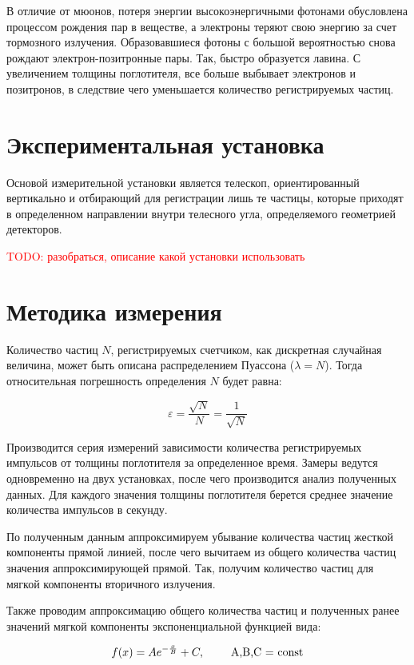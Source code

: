 \documentclass[reprint, nofootinbib, nobalancelastpage, 10pt]{revtex4-2}
\begin{document}
В отличие от мюонов, потеря энергии высокоэнергичными фотонами обусловлена процессом
рождения пар в веществе, а электроны теряют свою энергию за счет тормозного излучения.
Образовавшиеся фотоны с большой вероятностью снова рождают электрон-позитронные пары.
Так, быстро образуется лавина. С увеличением толщины поглотителя, все больше выбывает
электронов и позитронов, в следствие чего уменьшается количество регистрируемых частиц. 


\section*{Экспериментальная установка}

Основой измерительной установки является телескоп, ориентированный вертикально и
отбирающий для регистрации лишь те частицы, которые приходят в определенном направлении
внутри телесного угла, определяемого геометрией детекторов.

\textcolor{red}{TODO: разобраться, описание какой установки использовать}


\section*{Методика измерения}

Количество частиц $N$, регистрируемых счетчиком, как дискретная случайная величина, может
быть описана распределением Пуассона ($\lambda = N$). Тогда относительная погрешность
определения $N$ будет равна:

\[ \varepsilon = \dfrac{\sqrt{N}}{N} = \dfrac{1}{\sqrt{N}} \]

Производится серия измерений зависимости количества регистрируемых импульсов от толщины
поглотителя за определенное время. Замеры ведутся одновременно на двух установках, после
чего производится анализ полученных данных. Для каждого значения толщины поглотителя
берется среднее значение количества импульсов в секунду.

По полученным данным аппроксимируем убывание количества частиц жесткой компоненты прямой
линией, после чего вычитаем из общего количества частиц значения аппроксимирующей прямой.
Так, получим количество частиц для мягкой компоненты вторичного излучения.

Также проводим аппроксимацию общего количества частиц и полученных ранее значений мягкой
компоненты экспоненциальной функцией вида:

\[ f(x) = A e^{-\frac{x}{B}} + C,\text{\hspace*{20pt} A,B,C = const} \]
\end{document}
